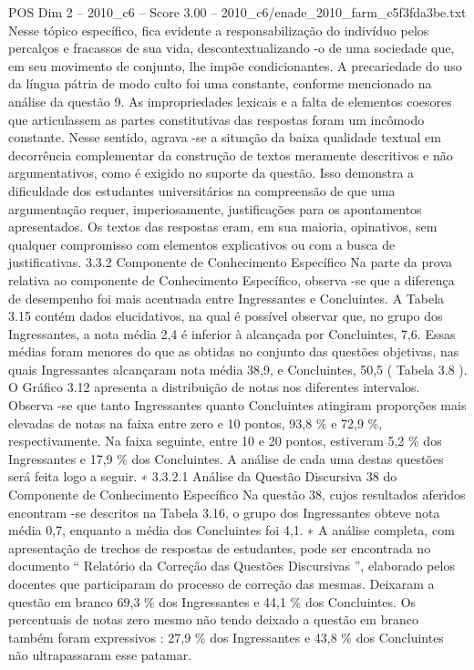 \begin{textsample}{POS Dim 2 – 2010\_c6 – Score 3.00 – 2010\_c6/enade\_2010\_farm\_c5f3fda3be.txt}
Nesse tópico específico, fica evidente a responsabilização do indivíduo pelos percalços e fracassos de sua vida, descontextualizando -o de uma sociedade que, em seu movimento de conjunto, lhe impõe condicionantes.
A precariedade do uso da língua pátria de modo culto foi uma constante, conforme mencionado na análise da questão 9.
As impropriedades lexicais e a falta de elementos coesores que articulassem as partes constitutivas das respostas foram um incômodo constante.
Nesse sentido, agrava -se a situação da baixa qualidade textual em decorrência complementar da construção de textos meramente descritivos e não argumentativos, como é exigido no suporte da questão.
Isso demonstra a dificuldade dos estudantes universitários na compreensão de que uma argumentação requer, imperiosamente, justificações para os apontamentos apresentados.
Os textos das respostas eram, em sua maioria, opinativos, sem qualquer compromisso com elementos explicativos ou com a busca de justificativas. 3.3.2 Componente de Conhecimento Específico Na parte da prova relativa ao componente de Conhecimento Específico, observa -se que a diferença de desempenho foi mais acentuada entre Ingressantes e Concluintes.
A Tabela 3.15 contém dados elucidativos, na qual é possível observar que, no grupo dos Ingressantes, a nota média 2,4 é inferior à alcançada por Concluintes, 7,6.
Essas médias foram menores do que as obtidas no conjunto das questões objetivas, nas quais Ingressantes alcançaram nota média 38,9, e Concluintes, 50,5 ( Tabela 3.8 ).
O Gráfico 3.12 apresenta a distribuição de notas nos diferentes intervalos.
Observa -se que tanto Ingressantes quanto Concluintes atingiram proporções mais elevadas de notas na faixa entre zero e 10 pontos, 93,8 \% e 72,9 \%, respectivamente.
Na faixa seguinte, entre 10 e 20 pontos, estiveram 5,2 \% dos Ingressantes e 17,9 \% dos Concluintes.
A análise de cada uma destas questões será feita logo a seguir. ∗ 3.3.2.1 Análise da Questão Discursiva 38 do Componente de Conhecimento Específico Na questão 38, cujos resultados aferidos encontram -se descritos na Tabela 3.16, o grupo dos Ingressantes obteve nota média 0,7, enquanto a média dos Concluintes foi 4,1. ∗ A análise completa, com apresentação de trechos de respostas de estudantes, pode ser encontrada no documento “ Relatório da Correção das Questões Discursivas ”, elaborado pelos docentes que participaram do processo de correção das mesmas.
Deixaram a questão em branco 69,3 \% dos Ingressantes e 44,1 \% dos Concluintes.
Os percentuais de notas zero mesmo não tendo deixado a questão em branco também foram expressivos : 27,9 \% dos Ingressantes e 43,8 \% dos Concluintes não ultrapassaram esse patamar.

\end{textsample}
